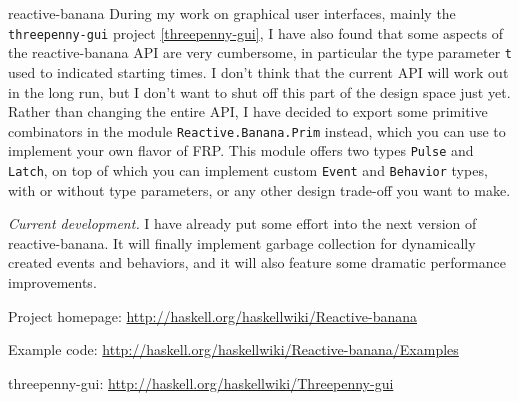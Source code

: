 \begin{hcarentry}[updated]{reactive-banana}
During my work on graphical user interfaces, mainly the \verb`threepenny-gui` project \cref{threepenny-gui}, I have also found that some aspects of the reactive-banana API are very cumbersome, in particular the type parameter \verb`t` used to indicated starting times. I don't think that the current API will work out in the long run, but I don't want to shut off this part of the design space just yet.
Rather than changing the entire API, I have decided to export some primitive combinators in the module \verb`Reactive.Banana.Prim` instead, which you can use to implement your own flavor of FRP. This module offers two types \verb`Pulse` and \verb`Latch`, on top of which you can implement custom \verb`Event` and \verb`Behavior` types, with or without type parameters, or any other design trade-off you want to make.

\emph{Current development.}
I have already put some effort into the next version of reactive-banana. It will finally implement garbage collection for dynamically created events and behaviors, and it will also feature some dramatic performance improvements.

\FurtherReading
\begin{compactitem}
\item Project homepage: \url{http://haskell.org/haskellwiki/Reactive-banana}
\item Example code: \url{http://haskell.org/haskellwiki/Reactive-banana/Examples}
\item threepenny-gui: \url{http://haskell.org/haskellwiki/Threepenny-gui}
\end{compactitem}
\end{hcarentry}
